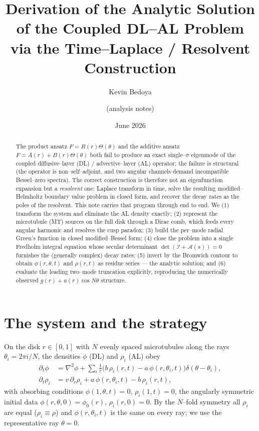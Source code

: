 \documentclass{article}
\title{Derivation of the Analytic Solution of the Coupled DL--AL Problem\\
via the Time--Laplace / Resolvent Construction}
\author{Kevin Bedoya \and (analysis notes)}
\date{June 2026}
\begin{document}
\maketitle

\begin{abstract}
The product ansatz $F=R(r)\Theta(\theta)$ and the additive ansatz
$F=A(r)+B(r)\Theta(\theta)$ both fail to produce an exact single--$\sigma$
eigenmode of the coupled diffusive--layer (DL) / advective--layer (AL) operator;
the failure is structural (the operator is non--self--adjoint, and two angular
channels demand incompatible Bessel--zero spectra). The correct construction is
therefore not an eigenfunction expansion but a \emph{resolvent} one: Laplace
transform in time, solve the resulting modified--Helmholtz boundary value problem
in closed form, and recover the decay rates as the poles of the resolvent. This
note carries that program through end to end. We (1) transform the system and
eliminate the AL density exactly; (2) represent the microtubule (MT) sources on
the full disk through a Dirac comb, which feeds every angular harmonic and
resolves the cusp paradox; (3) build the per--mode radial Green's function in
closed modified--Bessel form; (4) close the problem into a single Fredholm
integral equation whose secular determinant $\det(\mathcal I+\mathcal A(s))=0$
furnishes the (generally complex) decay rates; (5) invert by the Bromwich
contour to obtain $\phi(r,\theta,t)$ and $\rho(r,t)$ as residue series --- the
analytic solution; and (6) evaluate the leading two--mode truncation explicitly,
reproducing the numerically observed $g(r)+a(r)\cos N\theta$ structure.
\end{abstract}

\section{The system and the strategy}

On the disk $r\in[0,1]$ with $N$ evenly spaced microtubules along the rays
$\theta_i=2\pi i/N$, the densities $\phi$ (DL) and $\rho_i$ (AL) obey
\begin{align}
\partial_t\phi &=\nabla^2\phi
+\sum_{i}\frac1r\bigl(b\,\rho_i(r,t)-a\,\phi(r,\theta_i,t)\bigr)\delta(\theta-\theta_i),
\label{eq:phi}\\
\partial_t\rho_i &= v\,\partial_r\rho_i + a\,\phi(r,\theta_i,t)-b\,\rho_i(r,t),
\label{eq:rho}
\end{align}
with absorbing conditions $\phi(1,\theta,t)=0$, $\rho_i(1,t)=0$, the
angularly symmetric initial data $\phi(r,\theta,0)=\phi_0(r)$,
$\rho_i(r,0)=0$. By the $N$--fold symmetry all $\rho_i$ are equal
($\rho_i\equiv\rho$) and $\phi(r,\theta_i,t)$ is the same on every ray; we use the
representative ray $\theta=0$.
\end{document}
